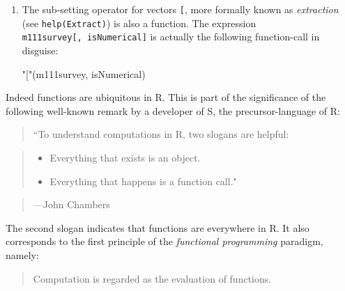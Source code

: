 \documentclass[]{book}
\makeatletter
\newenvironment{Shaded}{\begin{snugshade}}{\end{snugshade}}
\newcommand{\DecValTok}[1]{\textcolor[rgb]{0.00,0.00,0.81}{#1}}
\newcommand{\StringTok}[1]{\textcolor[rgb]{0.31,0.60,0.02}{#1}}
\newcommand{\CommentTok}[1]{\textcolor[rgb]{0.56,0.35,0.01}{\textit{#1}}}
\newcommand{\NormalTok}[1]{#1}
\providecommand{\tightlist}{%
  \setlength{\itemsep}{0pt}\setlength{\parskip}{0pt}}
\newenvironment{kframe}{%
\medskip{}
\setlength{\fboxsep}{.8em}
 \def\at@end@of@kframe{}%
 \ifinner\ifhmode%
  \def\at@end@of@kframe{\end{minipage}}%
  \begin{minipage}{\columnwidth}%
 \fi\fi%
 \def\FrameCommand##1{\hskip\@totalleftmargin \hskip-\fboxsep
 \colorbox{shadecolor}{##1}\hskip-\fboxsep
     \hskip-\linewidth \hskip-\@totalleftmargin \hskip\columnwidth}%
 \MakeFramed {\advance\hsize-\width
   \@totalleftmargin\z@ \linewidth\hsize
   \@setminipage}}%
 {\par\unskip\endMakeFramed%
 \at@end@of@kframe}
\renewenvironment{Shaded}{\begin{kframe}}{\end{kframe}}
\theoremstyle{definition}
\theoremstyle{definition}
\theoremstyle{definition}
\theoremstyle{remark}
\makeatother
\begin{document}
{\begin{enumerate}
  Thus, to assign the value 3 to that variable \texttt{a} one could
  write:

\begin{Shaded}
\begin{Highlighting}[]
\StringTok{"<-"}\NormalTok{(a, }\DecValTok{3}\NormalTok{)}
\NormalTok{a   }\CommentTok{# check that a is really 3}
\end{Highlighting}
\end{Shaded}

\begin{verbatim}
## [1] 3
\end{verbatim}
\item
  The sub-setting operator for vectors \texttt{{[}}, more formally known
  as \emph{extraction} (see \texttt{help(Extract)}) is also a function.
  The expression \texttt{m111survey{[},\ isNumerical{]}} is actually the
  following function-call in disguise:

\begin{Shaded}
\begin{Highlighting}[]
\StringTok{"["}\NormalTok{(m111survey, isNumerical)}
\end{Highlighting}
\end{Shaded}
\end{enumerate}

Indeed functions are ubiquitous in R. This is part of the significance
of the following well-known remark by a developer of S, the
precursor-language of R:

\begin{quote}
``To understand computations in R, two slogans are helpful:
\end{quote}

\begin{quote}
\begin{itemize}
\tightlist
\item
  Everything that exists is an object.
\item
  Everything that happens is a function call."
\end{itemize}
\end{quote}

\begin{quote}
---John Chambers
\end{quote}

The second slogan indicates that functions are everywhere in R. It also
corresponds to the first principle of the \emph{functional programming}
paradigm, namely:

\begin{quote}
Computation is regarded as the evaluation of functions.
\end{quote}

}
\end{document}
